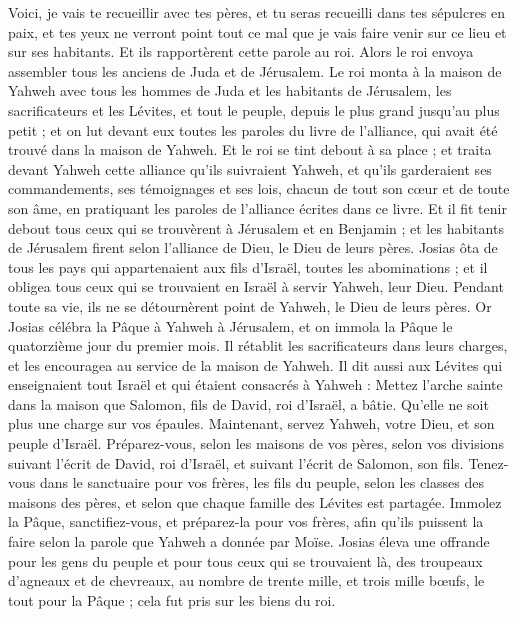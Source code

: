 \begin{multicols}{2}
Voici, je vais te recueillir avec tes pères, et tu seras recueilli dans tes sépulcres en paix, et tes yeux ne verront point tout ce mal que je vais faire venir sur ce lieu et sur ses habitants. Et ils rapportèrent cette parole au roi.
Alors le roi envoya assembler tous les anciens de Juda et de Jérusalem.
Le roi monta à la maison de Yahweh avec tous les hommes de Juda et les habitants de Jérusalem, les sacrificateurs et les Lévites, et tout le peuple, depuis le plus grand jusqu'au plus petit ; et on lut devant eux toutes les paroles du livre de l'alliance, qui avait été trouvé dans la maison de Yahweh.
Et le roi se tint debout à sa place ; et traita devant Yahweh cette alliance qu'ils suivraient Yahweh, et qu'ils garderaient ses commandements, ses témoignages et ses lois, chacun de tout son cœur et de toute son âme, en pratiquant les paroles de l'alliance écrites dans ce livre.
Et il fit tenir debout tous ceux qui se trouvèrent à Jérusalem et en Benjamin ; et les habitants de Jérusalem firent selon l'alliance de Dieu, le Dieu de leurs pères.
Josias ôta de tous les pays qui appartenaient aux fils d’Israël, toutes les abominations ; et il obligea tous ceux qui se trouvaient en Israël à servir Yahweh, leur Dieu. Pendant toute sa vie, ils ne se détournèrent point de Yahweh, le Dieu de leurs pères.
\VerseOne{}Or Josias célébra la Pâque à Yahweh à Jérusalem, et on immola la Pâque le quatorzième jour du premier mois.
Il rétablit les sacrificateurs dans leurs charges, et les encouragea au service de la maison de Yahweh.
Il dit aussi aux Lévites qui enseignaient tout Israël et qui étaient consacrés à Yahweh : Mettez l'arche sainte dans la maison que Salomon, fils de David, roi d'Israël, a bâtie. Qu’elle ne soit plus une charge sur vos épaules. Maintenant, servez Yahweh, votre Dieu, et son peuple d'Israël.
Préparez-vous, selon les maisons de vos pères, selon vos divisions suivant l'écrit de David, roi d'Israël, et suivant l'écrit de Salomon, son fils.
Tenez-vous dans le sanctuaire pour vos frères, les fils du peuple, selon les classes des maisons des pères, et selon que chaque famille des Lévites est partagée.
Immolez la Pâque, sanctifiez-vous, et préparez-la pour vos frères, afin qu'ils puissent la faire selon la parole que Yahweh a donnée par Moïse.
Josias éleva une offrande pour les gens du peuple et pour tous ceux qui se trouvaient là, des troupeaux d’agneaux et de chevreaux, au nombre de trente mille, et trois mille bœufs, le tout pour la Pâque ; cela fut pris sur les biens du roi.

\end{multicols}
